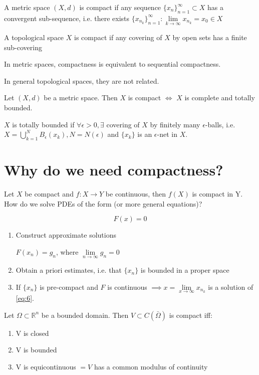 \documentclass{report}
\begin{document}
{
    A metric space \((X, d)\) is compact if any sequence \(\{x_{n}\}_{n=1}^{\infty} \subset X\) has a convergent sub-sequence, i.e. there exists \(\{x_{n_{k}}\}_{n=1}^{\infty} \colon \lim\limits_{k \to \infty} x_{n_{k}} = x_0 \in X\)
}

\dfn{}
{
    A topological space \(X\) is compact if any covering of \(X\) by open sets has a finite sub-covering
}

\begin{note}
    In metric spaces, compactness is equivalent to sequential compactness.

    In general topological spaces, they are not related.
\end{note}

{
    Let \((X, d)\) be a metric space. Then \(X\) is compact \(\iff\) \(X\) is complete and totally bounded.
}

\dfn{}
{
    \(X\) is totally bounded if \(\forall \epsilon > 0, \exists\) covering of \(X\) by finitely many \(\epsilon\)-balls, i.e. \(X = \bigcup_{k=1}^{N} B_{\epsilon}(x_k), N = N(\epsilon)\) and \(\{x_k\}\) is an \(\epsilon\)-net in \(X\).  
}

\section{Why do we need compactness?}
Let \(X\) be compact and \(f \colon X \to Y \) be continuous, then \(f(X)\) is compact in Y. How do we solve PDEs of the form (or more general equations)?

\begin{equation}\label{eq:6}
    F(x) = 0
\end{equation}

\begin{enumerate}
    \item Construct approximate solutions
    
    \(F(x_n) = g_n\), where \(\lim\limits_{n \to \infty} g_n = 0\)
    \item Obtain a priori estimates, i.e. that \(\{x_n\}\)  is bounded in a proper space
    \item If \(\{x_n\}\) is pre-compact and \(F\) is continuous \(\implies x = \lim\limits_{x \to \infty} x_{n_{k}}\) is a solution of \ref{eq:6}.
\end{enumerate}

{
    Let \(\Omega \subset \mathbb{R}^{n}\) be a bounded domain. Then \(V \subset C(\bar{\Omega})\) is compact iff:
    \begin{enumerate}
        \item V is closed
        \item V is bounded
        \item V is equicontinuous \(= V\) has a common modulus of continuity
    \end{enumerate} 
}
\end{document}
